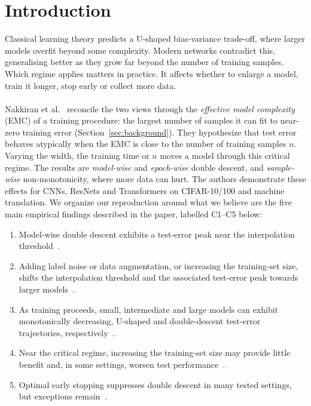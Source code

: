 \documentclass{article}
\begin{document}
\section{Introduction}
Classical learning theory predicts a U-shaped bias-variance trade-off, where larger models overfit beyond some complexity. Modern networks contradict this, generalising better as they grow far beyond the number of training samples. Which regime applies matters in practice. It affects whether to enlarge a model, train it longer, stop early or collect more data.
\\ \\
Nakkiran et al.~\cite{nakkiran2021deepdouble} reconcile the two views through the \emph{effective model complexity} (EMC) of a training procedure: the largest number of samples it can fit to near-zero training error (Section~\ref{sec:background}). They hypothesize that test error behaves atypically when the EMC is close to the number of training samples $n$. Varying the width, the training time or $n$ moves a model through this critical regime. The results are \emph{model-wise} and \emph{epoch-wise} double descent, and \emph{sample-wise} non-monotonicity, where more data
can hurt. The authors demonstrate these effects for CNNs, ResNets and Transformers on CIFAR-10/100 and machine translation. We organize our reproduction around what we believe are the five main empirical findings described in the paper, labelled C1--C5 below:
\begin{enumerate}
  \item[C1] Model-wise double descent exhibits a test-error peak near the interpolation threshold~\cite[Section~2, p.~6; Section~5]{nakkiran2021deepdouble}.
  \item[C2] Adding label noise or data augmentation, or increasing the training-set size, shifts the interpolation threshold and the associated test-error peak towards larger models~\cite[Section~5, p.~8]{nakkiran2021deepdouble}.
  \item[C3] As training proceeds, small, intermediate and large models can exhibit monotonically decreasing, U-shaped and double-descent test-error trajectories, respectively~\cite[Section~6, p.~10]{nakkiran2021deepdouble}.
  \item[C4] Near the critical regime, increasing the training-set size may provide little benefit and, in some settings, worsen test performance~\cite[Section~7, pp.~11--12]{nakkiran2021deepdouble}.
  \item[C5] Optimal early stopping suppresses double descent in many tested settings, but exceptions remain~\cite[Section~8, p.~15]{nakkiran2021deepdouble}.
\end{enumerate}
\end{document}
